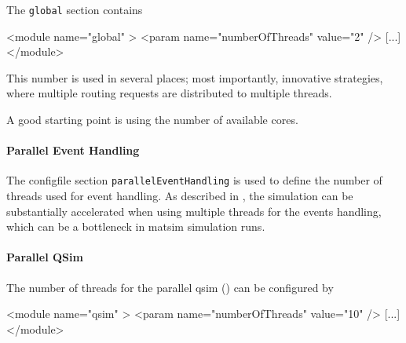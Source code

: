 The \lstinline{global} section contains
\begin{xml}
<module name="global" >
    <param name="numberOfThreads" value="2" />
    [...]
</module>
\end{xml}
This number is used in several places; most importantly, innovative strategies, where multiple routing requests are distributed to multiple threads.

A good starting point is using the number of available cores.

\paragraph{Parallel Event Handling}
\label{sec:using-paralleleventhandling}

The \gls{configfile} section \lstinline|parallelEventHandling| is used to define the number of threads used for event handling. 
As described in \citet[][]{WaraichEtAl_STRC_2009}, the simulation can be substantially accelerated when using multiple threads for the events handling, which can be a bottleneck in \gls{matsim} simulation runs.


\paragraph{Parallel QSim}

The number of threads for the parallel \gls{qsim} (\cf \cite{Dobler_PhDThesis_2013}) can be configured by
\begin{xml}
<module name="qsim" >
    <param name="numberOfThreads" value="10" />
    [...]
</module>
\end{xml}


